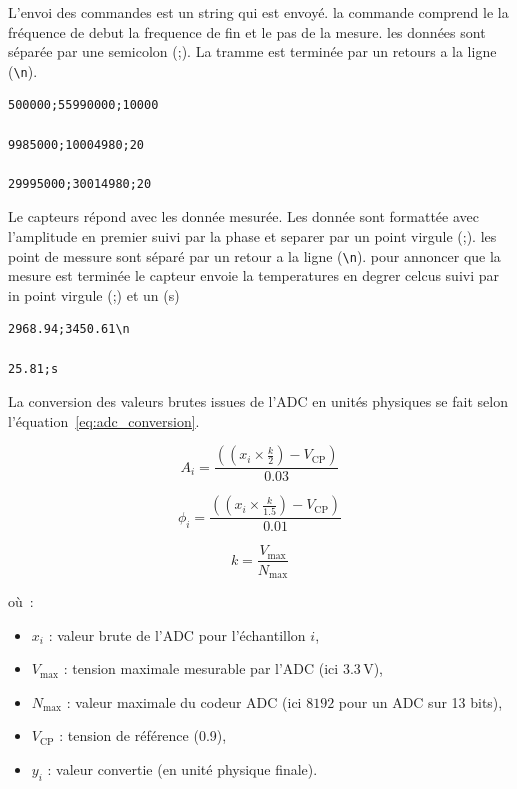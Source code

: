 L'envoi des commandes est un string qui est envoyé. la commande comprend le la fréquence de debut la frequence de fin et le pas de la mesure. les données sont séparée par une semicolon (;). La tramme est terminée par un retours a la ligne (\texttt{\textbackslash n}).
\begin{verbatim}
500000;55990000;10000

9985000;10004980;20

29995000;30014980;20
\end{verbatim}
Le capteurs répond avec les donnée mesurée. Les donnée sont formattée avec l'amplitude en premier suivi par la phase et separer par un point virgule (;). les point de messure sont séparé par un retour a la ligne (\texttt{\textbackslash n}).
pour annoncer que la mesure est terminée le capteur envoie la temperatures en degrer celcus suivi par in point virgule (;) et un (s)

\begin{verbatim}
2968.94;3450.61\n

25.81;s
\end{verbatim}

La conversion des valeurs brutes issues de l'ADC en unités physiques se fait selon l'équation~\ref{eq:adc_conversion}.

\begin{equation}
A_i = \frac{\left( \left( x_i \times \frac{k}{2} \right) - V_{\text{CP}} \right)}{0.03}
\label{eq:adc_conversion_Amplitude}
\end{equation}

\begin{equation}
\phi_i = \frac{\left( \left( x_i \times \frac{k}{1.5} \right) - V_{\text{CP}} \right)}{0.01}
\label{eq:adc_conversion_phase}
\end{equation}

\begin{equation}
k = \frac{V_{\text{max}}}{N_{\text{max}}}
\label{eq:adc_conversion}
\end{equation}

où :
\begin{itemize}
    \item $x_i$ : valeur brute de l'ADC pour l'échantillon $i$,
    \item $V_{\text{max}}$ : tension maximale mesurable par l'ADC (ici $3.3\,\mathrm{V}$),
    \item $N_{\text{max}}$ : valeur maximale du codeur ADC (ici $8192$ pour un ADC sur 13 bits),
    \item $V_{\text{CP}}$ : tension de référence (0.9),
    \item $y_i$ : valeur convertie (en unité physique finale).
\end{itemize}

